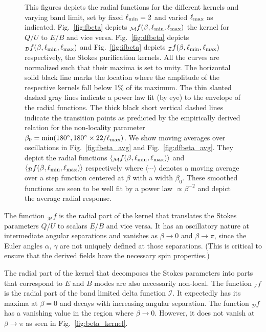 \documentclass[a4paper,11pt]{article}
\newcommand{\mm}{\mathcal{M}}
\newcommand{\md}{\mathcal{D}}
\newcommand{\mi}{\mathcal{I}}
\def\fig#1{{Fig.~\ref{#1}}}
\begin{document}
\begin{figure}[t]
\caption{This figures depicts the radial functions for the different kernels and varying band limit, set by fixed $\ell_{\rm min}=2$ and varied $\ell_{\rm max}$ as indicated. \fig{fig:fbeta} depicts ${_{\mm}f}(\beta,\ell_{\rm min},\ell_{\rm max})$ the kernel for $Q/U$ to $E/B$ and vice versa. \fig{fig:dfbeta} depicts ${}_{\md}f(\beta,\ell_{\rm min},\ell_{\rm max})$ and  \fig{fig:ifbeta} depicts ${}_{\mi}f(\beta,\ell_{\rm min},\ell_{\rm max})$ respectively, the Stokes purification kernels. All the curves are normalized such that their maxima is set to unity. The horizontal solid black line marks the location where the amplitude of the respective kernels fall below 1\% of its maximum. The thin slanted dashed gray lines indicate a power law fit (by eye) to the envelope of the radial functions. The thick black short vertical dashed lines indicate the transition points as predicted by the empirically derived relation for the non-locality parameter $\beta_0={\rm min}(180^\circ,180^\circ \times 22/\ell_{\rm max})$.  We show moving averages over oscillations in \fig{fig:fbeta_avg} and  \fig{fig:dfbeta_avg}.  They depict the radial functions $\langle{_{\mm}f}(\beta,\ell_{\rm min},\ell_{\rm max})\rangle$ and $\langle{_{\md}f}(\beta,\ell_{\rm min},\ell_{\rm max})\rangle$ respectively where $\langle \cdots \rangle$ denotes a moving average over a step function centered at $\beta$ with a width $\beta_0$. These smoothed functions are seen to be well fit by a power law $\propto \beta^{-2}$  and depict the average radial response.}
\label{fig:rad_ker_decay}
\end{figure}
%

The function ${_{\mm}f}$ is the radial part of the kernel that translates the Stokes parameters $Q$/$U$ to scalars $E$/$B$ and vice versa.  It has an oscillatory nature at intermediate angular separations and vanishes as $\beta \rightarrow 0$ and $\beta \rightarrow \pi$, since the Euler angles $\alpha$, $\gamma$ are not uniquely defined at those separations. (This is critical to ensure that the derived fields have the necessary spin properties.)

The radial part of the kernel that decomposes the  Stokes parameters into parts that correspond to $E$ and $B$ modes  are also  necessarily non-local.  The function ${_{\mi}f}$ is the radial part of the band limited delta function $\mi$.  It expectedly has its maxima at $\beta=0$ and decays with increasing angular separation.  The function ${_{\md}f}$ has a vanishing value in the region where $\beta \rightarrow 0$.   However, it does not vanish at $\beta \rightarrow \pi$ as seen in \fig{fig:beta_kernel}.
\end{document}
